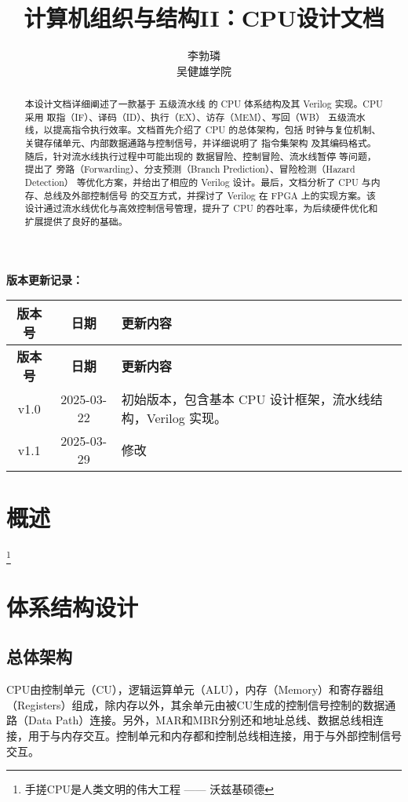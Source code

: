 \documentclass[lang=cn,a4paper,newtx]{elegantpaper}
\title{计算机组织与结构II：CPU设计文档}
\author{李勃璘 \\ 吴健雄学院}
\date{\zhdate{2025/3/22}}
\begin{document}
\maketitle
\thispagestyle{empty}
\begin{abstract}
本设计文档详细阐述了一款基于 五级流水线 的 CPU 体系结构及其 Verilog 实现。CPU 采用 取指（IF）、译码（ID）、执行（EX）、访存（MEM）、写回（WB） 五级流水线，以提高指令执行效率。文档首先介绍了 CPU 的总体架构，包括 时钟与复位机制、关键存储单元、内部数据通路与控制信号，并详细说明了 指令集架构 及其编码格式。随后，针对流水线执行过程中可能出现的 数据冒险、控制冒险、流水线暂停 等问题，提出了 旁路（Forwarding）、分支预测（Branch Prediction）、冒险检测（Hazard Detection） 等优化方案，并给出了相应的 Verilog 设计。最后，文档分析了 CPU 与内存、总线及外部控制信号 的交互方式，并探讨了 Verilog 在 FPGA 上的实现方案。该设计通过流水线优化与高效控制信号管理，提升了 CPU 的吞吐率，为后续硬件优化和扩展提供了良好的基础。
\end{abstract}
\vspace{1cm}

\textbf{版本更新记录：}

\begin{longtable*}{|c|c|p{10cm}|}
  \hline
  \textbf{版本号} & \textbf{日期} & \textbf{更新内容} \\
  \hline
  \endfirsthead

  \hline
  \textbf{版本号} & \textbf{日期} & \textbf{更新内容} \\
  \hline
  \endhead

  v1.0 & 2025-03-22 & 初始版本，包含基本 CPU 设计框架，流水线结构，Verilog 实现。 \\
  \hline
  v1.1 & 2025-03-29 & 修改 \\

\end{longtable*}


\newpage
{}
\tableofcontents
\newpage
\listoftables
\newpage
{}
\section{概述}
\lipsum[1]\footnote{手搓CPU是人类文明的伟大工程 —— 沃兹基硕德}


\section{体系结构设计}
\subsection{总体架构}
CPU由控制单元（CU），逻辑运算单元（ALU），内存（Memory）和寄存器组（Registers）组成，除内存以外，其余单元由被CU生成的控制信号控制的数据通路（Data Path）连接。另外，MAR和MBR分别还和地址总线、数据总线相连接，用于与内存交互。控制单元和内存都和控制总线相连接，用于与外部控制信号交互。
\end{document}
